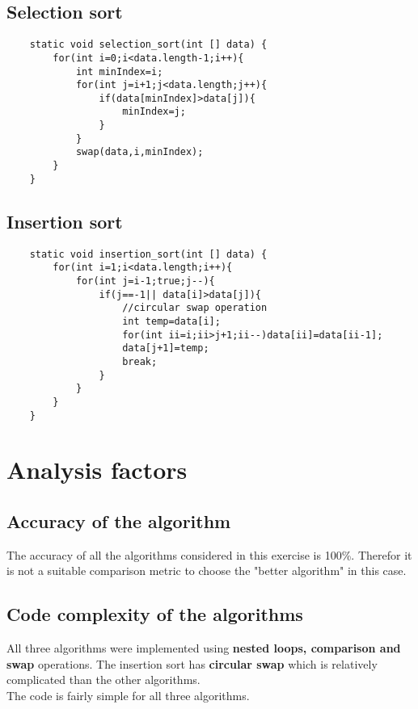 \documentclass[11pt]{article}
\begin{document}
\subsection{Selection sort}
\begin{lstlisting}
    static void selection_sort(int [] data) {
        for(int i=0;i<data.length-1;i++){
            int minIndex=i;
            for(int j=i+1;j<data.length;j++){
                if(data[minIndex]>data[j]){
                    minIndex=j;
                }
            }
            swap(data,i,minIndex);
        }
    }
\end{lstlisting}


\subsection{Insertion sort}
\begin{lstlisting}
    static void insertion_sort(int [] data) {
        for(int i=1;i<data.length;i++){
            for(int j=i-1;true;j--){
                if(j==-1|| data[i]>data[j]){
                    //circular swap operation
                    int temp=data[i];
                    for(int ii=i;ii>j+1;ii--)data[ii]=data[ii-1];
                    data[j+1]=temp;
                    break;
                }
            }
        }
    }
\end{lstlisting}



\section{Analysis factors}
\subsection{Accuracy of the algorithm}
The accuracy of all the algorithms considered in this exercise is 100\%. Therefor it is not a suitable comparison metric to choose the "better algorithm" in this case.

\subsection{Code complexity of the algorithms}
All three algorithms were implemented using \textbf{nested loops, comparison and swap} operations. The insertion sort has \textbf{circular swap} which is relatively complicated than the other algorithms.\\The code is fairly simple for all three algorithms. 
\end{document}
